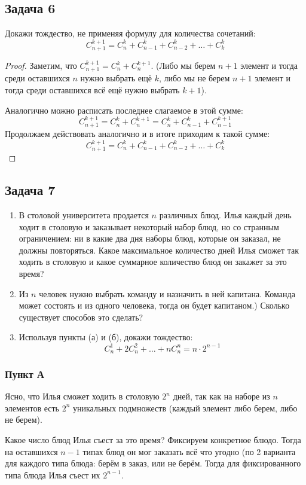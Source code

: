 \subsection{Задача 6}
Докажи тождество, не применяя формулу для количества сочетаний:
\[
C^{k+1}_{n+1} = C^{k}_{n} + C^{k}_{n-1} + C^k_{n-2} + \ldots + C^k_k
\]
\begin{proof}
Заметим, что $C^{k+1}_{n+1} = C^{k}_{n} + C^{k+1}_{n}$. (Либо мы берем $n+1$ элемент и тогда среди оставшихся $n$ нужно выбрать ещё $k$, либо мы не берем $n + 1$ элемент и тогда среди оставшихся всё ещё нужно выбрать $k + 1$).

Аналогично можно расписать последнее слагаемое в этой сумме:
\[
C^{k+1}_{n+1} = C^{k}_{n} + C^{k+1}_{n} = C^{k}_{n} + C^{k}_{n-1} + C^{k+1}_{n-1}
\]
Продолжаем действовать аналогично и в итоге приходим к такой сумме:
\[
C^{k+1}_{n+1} = C^{k}_{n} + C^{k}_{n-1} + C^k_{n-2} + \ldots + C^k_k
\]
\end{proof}

\subsection{Задача 7}

\begin{enumerate}[label=\asbuk*)]
\item В столовой университета продается $n$ различных блюд. Илья каждый день ходит
в столовую и заказывает некоторый набор блюд, но со странным ограничением: ни в
какие два дня наборы блюд, которые он заказал, не должны повторяться. Какое максимальное количество дней Илья сможет так ходить в столовую и какое суммарное количество блюд он закажет за это время?
\item Из $n$ человек нужно выбрать команду и назначить в ней капитана. Команда может состоять и из одного человека, тогда он будет капитаном.) Сколько существует способов это сделать?
\item Используя пункты (а) и (б), докажи тождество:
\[
C^1_n + 2C^2_n + \ldots + nC^n_n = n \cdot 2^{n-1}
\]
\end{enumerate}

\subsubsection{Пункт А}
Ясно, что Илья сможет ходить в столовую $2^n$ дней, так как на наборе из $n$ элементов есть $2^n$ уникальных подмножеств (каждый элемент либо берем, либо не берем).

Какое число блюд Илья съест за это время? Фиксируем конкретное блюдо. Тогда на оставшихся $n - 1$ типах блюд он мог заказать всё что угодно (по 2 варианта для каждого типа блюда: берём в заказ, или не берём. Тогда для фиксированного типа блюда Илья съест их $2^{n-1}$.


